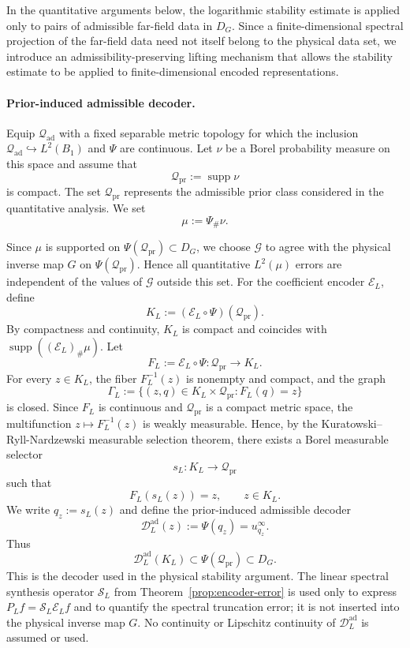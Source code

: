 \documentclass{article}
\numberwithin{equation}{section}
\theoremstyle{plain}
\begin{document}
	In the quantitative arguments below, the logarithmic stability estimate is applied only to pairs of admissible far-field data in $D_G$. Since a finite-dimensional spectral projection of the far-field data need not itself belong to the physical data set, we introduce an admissibility-preserving lifting mechanism that allows the stability estimate to be applied to finite-dimensional encoded representations.

	\paragraph{Prior-induced admissible decoder.}
	Equip $\mathcal Q_{\mathrm{ad}}$ with a fixed separable metric topology for which the inclusion
	$\mathcal Q_{\mathrm{ad}}\hookrightarrow L^2(B_1)$ and $\Psi$ are continuous. Let $\nu$ be a Borel probability measure on this space and assume that
	\[
	\mathcal Q_{\mathrm{pr}}:=\operatorname{supp}\nu
	\]
	is compact. The set $\mathcal Q_{\mathrm{pr}}$ represents the admissible prior class considered in the quantitative analysis. We set
	\[
	\mu:=\Psi_{\#}\nu .
	\]

		Since $\mu$ is supported on
		$\Psi(\mathcal Q_{\mathrm{pr}})\subset D_G$, we choose
		$\mathscr G$ to agree with the physical inverse map $G$ on
		$\Psi(\mathcal Q_{\mathrm{pr}})$. Hence all quantitative
		$L^2(\mu)$ errors are independent of the values of $\mathscr G$ outside this set.
	For the
	coefficient encoder $\mathcal E_L$, define
	\[
	K_L := (\mathcal E_L\circ \Psi)(\mathcal Q_{\mathrm{pr}}).
	\]
	By compactness and continuity, $K_L$ is compact and coincides with
	$\operatorname{supp}((\mathcal E_L)_{\#}\mu)$. Let
	\[
	F_L := \mathcal E_L\circ \Psi : \mathcal Q_{\mathrm{pr}}\to K_L .
	\]
	For every $z\in K_L$, the fiber $F_L^{-1}(z)$ is nonempty and compact, and
	the graph
	\[
	\Gamma_L
	:=
	\{(z,q)\in K_L\times \mathcal Q_{\mathrm{pr}}: F_L(q)=z\}
	\]
	is closed. Since $F_L$ is continuous and $\mathcal Q_{\mathrm{pr}}$ is a compact metric space, the multifunction $z\mapsto F_L^{-1}(z)$ is weakly measurable. Hence, by the Kuratowski--Ryll-Nardzewski measurable selection
	theorem, there exists a Borel measurable selector
	\[
	s_L:K_L\to \mathcal Q_{\mathrm{pr}}
	\]
	such that
	\[
	F_L(s_L(z))=z,\qquad z\in K_L .
	\]
	We write $q_z:=s_L(z)$ and define the prior-induced admissible decoder
	\[
	\mathcal D_L^{\mathrm{ad}}(z):=\Psi(q_z)=u^\infty_{q_z}.
	\]
	Thus
	\[
	\mathcal D_L^{\mathrm{ad}}(K_L)
	\subset \Psi(\mathcal Q_{\mathrm{pr}})
	\subset D_G .
	\]
	This is the decoder used in the physical stability argument. The linear
	spectral synthesis operator $\mathcal S_L$ from Theorem~\ref{prop:encoder-error} is used only to express
	$P_L f=\mathcal S_L\mathcal E_L f$ and to quantify the spectral truncation error; it is
	not inserted into the physical inverse map $G$. No continuity or Lipschitz
	continuity of $\mathcal D_L^{\mathrm{ad}}$ is assumed or used.
	
\end{document}
